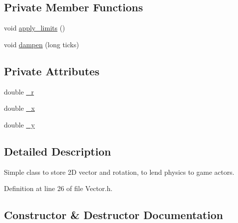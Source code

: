 \subsection*{Private Member Functions}
\begin{DoxyCompactItemize}
\item 
void \hyperlink{classAsteroids_1_1Domain_1_1Game_1_1Actors_1_1Vector_a1191bc524d82418f4f7ebbf782374b65}{apply\+\_\+limits} ()
\item 
void \hyperlink{classAsteroids_1_1Domain_1_1Game_1_1Actors_1_1Vector_a7432d5e9efef0bbf2d64a53c410e2855}{dampen} (long ticks)
\end{DoxyCompactItemize}
\subsection*{Private Attributes}
\begin{DoxyCompactItemize}
\item 
double \hyperlink{classAsteroids_1_1Domain_1_1Game_1_1Actors_1_1Vector_ad0ecfe3789bab99c0052b0eeafcfc60f}{\+\_\+r}
\item 
double \hyperlink{classAsteroids_1_1Domain_1_1Game_1_1Actors_1_1Vector_a008778e8412a6fba20c755a5b784fb34}{\+\_\+x}
\item 
double \hyperlink{classAsteroids_1_1Domain_1_1Game_1_1Actors_1_1Vector_a78c9c431c461fbe39be37c393c7fe1ba}{\+\_\+y}
\end{DoxyCompactItemize}


\subsection{Detailed Description}
Simple class to store 2D vector and rotation, to lend physics to game actors. 

Definition at line 26 of file Vector.\+h.



\subsection{Constructor \& Destructor Documentation}
\mbox{\label{classAsteroids_1_1Domain_1_1Game_1_1Actors_1_1Vector_a1ae45243cda745174556aaed9cb2bdab}} 
